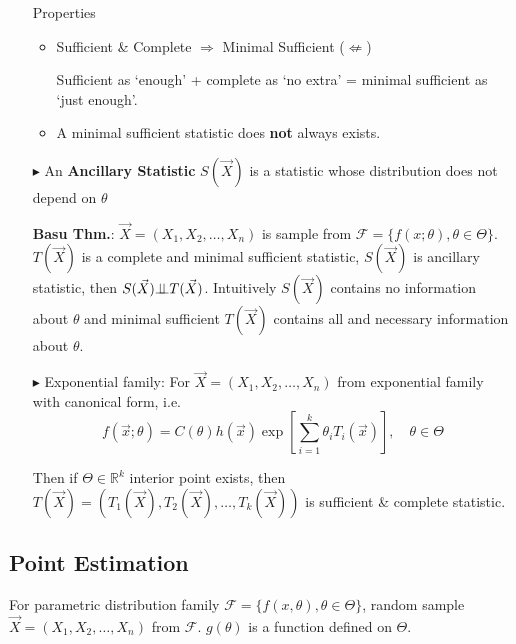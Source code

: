 \begin{itemize}
        Properties
        \begin{itemize}[topsep=2pt,itemsep=0pt]
            \item Sufficient \& Complete $\Rightarrow $ Minimal Sufficient ($ \not\Leftarrow $)
            
            Sufficient as `enough' + complete as `no extra' = minimal sufficient as `just enough'.
            

            \item A minimal sufficient statistic does \textbf{not} always exists.
        \end{itemize}
        
        \item[$\blacktriangleright$]  An \textbf{Ancillary Statistic} $S(\vec{X})$ is a statistic whose distribution does not depend on $\theta$
        
        \textbf{Basu Thm.}: $\vec{X}=(X_1,X_2,\ldots,X_n)$ is sample from $\mathscr{F}=\{f(x;\theta),\theta\in\Theta\}$. $T(\vec{X})$ is a complete and minimal sufficient statistic, $S(\vec{X})$ is ancillary statistic, then $S(\vec{X})\bot\!\!\!\bot T(\vec{X})$. Intuitively $ S(\vec{X}) $ contains no information about $ \theta  $ and minimal sufficient $ T(\vec{X}) $ contains all and necessary information about $ \theta  $.

        \item[$\blacktriangleright$] Exponential family: For $\vec{X}=(X_1,X_2,\ldots,X_n)$ from exponential family with canonical form, i.e.
    \begin{equation}
        f(\vec{x};\theta)=C(\theta)h(\vec{x})\exp\left[\sum_{i=1}^k \theta_i T_i(\vec{x})\right] ,\quad \theta\in\Theta
    \end{equation}

    Then if $\Theta\in\mathbb{R}^k$ interior point exists, then $T(\vec{X})=(T_1(\vec{X}),T_2(\vec{X}),\ldots,T_k(\vec{X}))$ is sufficient \& complete statistic.


\end{itemize} 




\subsection{Point Estimation}\label{SectionPointEstimation}
    For parametric distribution family $\mathscr{F}=\{f(x,\theta),\theta\in\Theta\}$, random sample $\vec{X}=(X_1,X_2,\ldots,X_n)$ from $\mathscr{F}$. $g(\theta)$ is a function defined on $\Theta$. 

